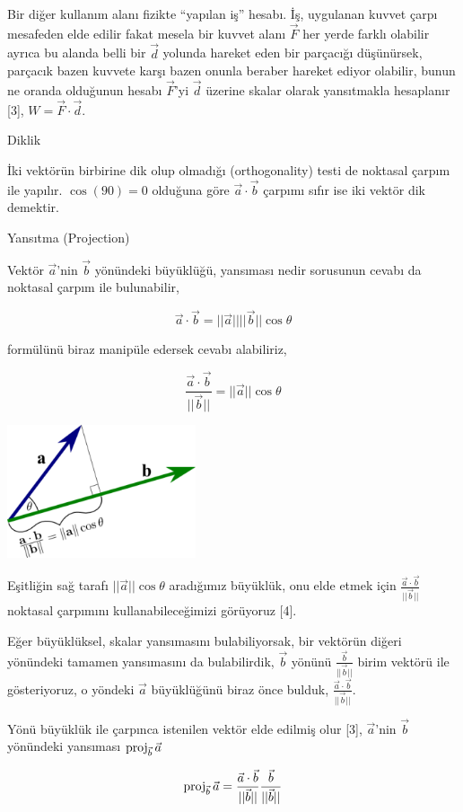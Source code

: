 \documentclass[12pt,fleqn]{article}\usepackage{../../common}
\begin{document}
Bir diğer kullanım alanı fizikte ``yapılan iş'' hesabı. İş, uygulanan kuvvet
çarpı mesafeden elde edilir fakat mesela bir kuvvet alanı $\vec{F}$ her yerde
farklı olabilir ayrıca bu alanda belli bir $\vec{d}$ yolunda hareket eden bir
parçacığı düşünürsek, parçacık bazen kuvvete karşı bazen onunla beraber hareket
ediyor olabilir, bunun ne oranda olduğunun hesabı $\vec{F}$'yi $\vec{d}$ üzerine
skalar olarak yansıtmakla hesaplanır [3], $W = \vec{F} \cdot \vec{d}$.

Diklik

İki vektörün birbirine dik olup olmadığı (orthogonality) testi de noktasal
çarpım ile yapılır. $\cos(90) = 0$ olduğuna göre $\vec{a}\cdot\vec{b}$ çarpımı
sıfır ise iki vektör dik demektir. 

Yansıtma (Projection)

Vektör $\vec{a}$'nin $\vec{b}$ yönündeki büyüklüğü, yansıması nedir sorusunun
cevabı da noktasal çarpım ile bulunabilir, 

$$
\vec{a}\cdot\vec{b} = ||\vec{a}||||\vec{b}||\cos\theta
$$

formülünü biraz manipüle edersek cevabı alabiliriz, 

$$
\frac{\vec{a}\cdot\vec{b}}{||\vec{b}||} = ||\vec{a}|| \cos \theta
$$

\includegraphics[width=15em]{dot_product_projection.png}

Eşitliğin sağ tarafı $||\vec{a}|| \cos \theta$ aradığımız büyüklük, onu elde
etmek için $\frac{\vec{a}\cdot\vec{b}}{||\vec{b}||}$ noktasal çarpımını
kullanabileceğimizi görüyoruz [4].

Eğer büyüklüksel, skalar yansımasını bulabiliyorsak, bir vektörün diğeri
yönündeki tamamen yansımasını da bulabilirdik, $\vec{b}$ yönünü
$\frac{\vec{b}}{||\vec{b}||}$ birim vektörü ile gösteriyoruz, o yöndeki
$\vec{a}$ büyüklüğünü biraz önce bulduk,
$\frac{\vec{a}\cdot\vec{b}}{||\vec{b}||}$.

Yönü büyüklük ile çarpınca istenilen vektör elde edilmiş olur [3], $\vec{a}$'nin
$\vec{b}$ yönündeki yansıması $\operatorname{proj}_{\vec{b}} \vec{a}$

$$
\operatorname{proj}_{\vec{b}} \vec{a} = \frac{\vec{a}\cdot\vec{b}}{||\vec{b}||} \frac{\vec{b}}{||\vec{b}||}
$$
\end{document}
